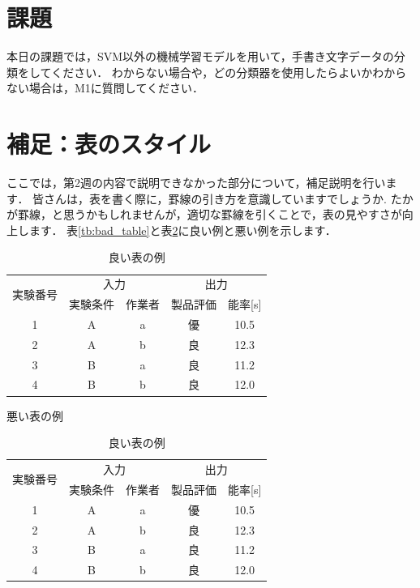 \documentclass{jarticle}
\begin{document}
\section{課題}
本日の課題では，SVM以外の機械学習モデルを用いて，手書き文字データの分類をしてください．
わからない場合や，どの分類器を使用したらよいかわからない場合は，M1に質問してください．

\appendix
\section{補足：表のスタイル}
ここでは，第2週の内容で説明できなかった部分について，補足説明を行います．
皆さんは，表を書く際に，罫線の引き方を意識していますでしょうか.
たかが罫線，と思うかもしれませんが，適切な罫線を引くことで，表の見やすさが向上します．
表\ref{tb:bad_table}と表\ref{tb:good_table}に良い例と悪い例を示します．

\begin{table}[H]
  \begin{minipage}[t]{.45\textwidth}
    \begin{center}
      \begin{tabular}{|c|c|c|c|c|}\hline
        \multirow{2}{*}{実験番号} & \multicolumn{2}{c}{入力} & \multicolumn{2}{c|}{出力}\\ \cline{2-5}
        & 実験条件 & 作業者 & 製品評価 & 能率[s] \\ \hline
        1 & A & a & 優 & 10.5 \\\hline
        2 & A & b & 良 & 12.3 \\\hline
        3 & B & a & 良 & 11.2 \\\hline
        4 & B & b & 良 & 12.0 \\\hline
      \end{tabular}
    \end{center}
    \caption{悪い表の例}
    \label{tb:bad_table}
  \end{minipage}
  \hfill
  \begin{minipage}[t]{.45\textwidth}
    \begin{center}
      \begin{tabular}{c|cc|cc}\toprule
        \multirow{2}{*}{実験番号} & \multicolumn{2}{c|}{入力} & \multicolumn{2}{c}{出力}\\
        & 実験条件 & 作業者 & 製品評価 & 能率[s] \\ \hline
        1 & A & a & 優 & 10.5 \\
        2 & A & b & 良 & 12.3 \\
        3 & B & a & 良 & 11.2 \\
        4 & B & b & 良 & 12.0 \\\hline
      \end{tabular}
    \end{center}
    \caption{良い表の例}
    \label{tb:good_table}
  \end{minipage}
\end{table}
\end{document}

